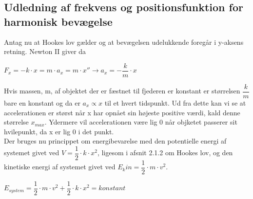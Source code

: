 \subsection{Udledning af frekvens og positionsfunktion for harmonisk bevægelse}

Antag nu at Hookes lov gælder og at bevægelsen udelukkende foregår i y-aksens retning. Newton II giver da 

\bigskip

\begin{center}
$F_x = -k \cdot x = m \cdot a_x = m \cdot x'' \rightarrow a_x = -\dfrac{k}{m} \cdot x$
\end{center}

\bigskip

Hvis massen, m, af objektet der er fæstnet til fjederen er konstant er størrelsen $\dfrac{k}{m}$ bare en konstant og da er $a_x \propto x$ til et hvert tidspunkt. Ud fra dette kan vi se at accelerationen er størst når x har opnået sin højeste positive værdi, kald denne størrelse $x_{max}$. Ydermere vil accelerationen være lig 0 når objketet passerer sit hvilepunkt, da x er lig 0 i det punkt.
\\

Der bruges nu princippet om energibevarelse med den potentielle energi af systemet givet ved $V=\dfrac{1}{2} \cdot k \cdot x^2$, ligesom i afsnit 2.1.2 om Hookes lov, og den kinetiske energi af systemet givet ved $E_kin = \dfrac{1}{2} \cdot m \cdot v^2$.

\bigskip

\begin{center}
$E_{system}=\dfrac{1}{2} \cdot m \cdot v^2 + \dfrac{1}{2} \cdot k \cdot x^2 = konstant$
\end{center}

